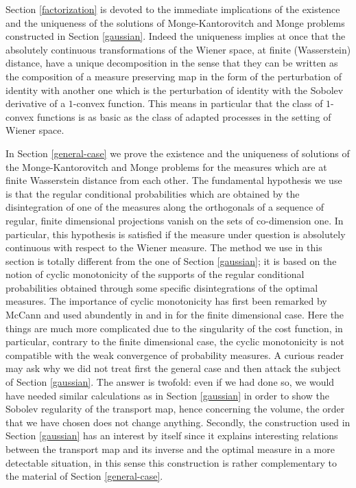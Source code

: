 \documentclass[12pt,a4paper]{book}
\begin{document}
Section \ref{factorization} is devoted to the immediate
implications of the existence and the  uniqueness  of the solutions of 
Monge-Kantorovitch and Monge  problems constructed in Section \ref{gaussian}. 
Indeed the uniqueness  implies at once that the absolutely continuous
transformations of the Wiener space, at finite (Wasserstein) distance,
have a unique decomposition in the sense that they can be written as
the composition of a measure preserving map in the form of the
perturbation of identity with another one which is the perturbation of
identity with the Sobolev derivative of a $1$-convex function. This
means in particular that the class  of  $1$-convex functions is  as
basic  as the class  of adapted processes in the setting  of Wiener space.

In Section \ref{general-case} we prove the existence and the
uniqueness of solutions of the   Monge-Kantorovitch and Monge 
problems  for the measures which are at finite Wasserstein distance  from
each other. The fundamental  hypothesis  we use  is that the regular
conditional probabilities which are obtained by the disintegration of
one of the measures along the orthogonals of a sequence of regular, finite
dimensional projections vanish on the sets of co-dimension one. In
particular, this hypothesis  is satisfied if the measure under
question is absolutely continuous with respect to the Wiener measure.
The method  we use in this section is totally  different from the one
of Section \ref{gaussian}; it is  based on the notion of 
cyclic monotonicity of the supports of the regular conditional
probabilities obtained through some specific  disintegrations of the
optimal measures. The importance of cyclic monotonicity has first been
remarked by McCann and used abundently in \cite{Mc1} and in
\cite{G-Mc} for the finite dimensional case. Here the things are much
more complicated due to the singularity of the cost function, in
particular, contrary to the finite dimensional case,  the cyclic
monotonicity  is not compatible with the weak convergence of
probability measures.  A curious reader may ask why we did not treat
first the general case and then attack the subject of Section
\ref{gaussian}. The answer is twofold: even if we had done so, we
would have needed similar calculations as in Section \ref{gaussian} in
order to show the Sobolev regularity of the transport map, hence
concerning the volume, the order that we have chosen does not change
anything. Secondly, the construction used in  Section \ref{gaussian}
has  an interest by itself since it explains interesting  relations
between the transport map and its inverse and the optimal measure in a
more detectable situation, in this sense this construction  is rather
complementary to the material of Section \ref{general-case}.
\end{document}

